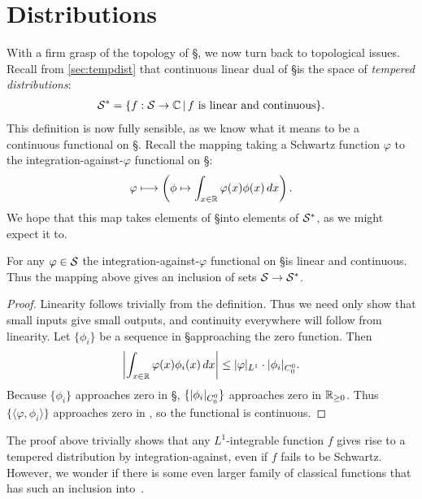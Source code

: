 
  \setcounter{chapter}{2}
  \setcounter{thm}{0}
  \chapter{Distributions}
  \label{ch:dists}
  
  With a firm grasp of the topology of \S, we now turn back to topological issues.
  Recall from \cref{sec:tempdist} that continuous linear dual of \S is the space of \emph{tempered distributions}:
  \begin{align*}
    \S^* = \{f:\S\rightarrow\C\,\vert\,f\text{ is linear and continuous}\} \text{.}
  \end{align*}
  This definition is now fully sensible, as we know what it means to be a continuous functional on \S.
  Recall the mapping taking a Schwartz function $\varphi$ to the integration-against-$\varphi$ functional on \S:
  \begin{align*}
    \varphi \longmapsto \left( \phi \mapsto \int_{x\in\R} \varphi(x) \phi(x)\,dx \right) \text{.}
  \end{align*}
  We hope that this map takes elements of \S into elements of $\S^*$, as we might expect it to.
  \begin{thm}
    \label{thm:intagainstiscont}
    For any $\varphi\in\S$ the integration-against-$\varphi$ functional on \S is linear and continuous.
    Thus the mapping above gives an inclusion of sets $\S\rightarrow\S^*$.
  \end{thm}
  \begin{proof}
    Linearity follows trivially from the definition.
    Thus we need only show that small inputs give small outputs, and continuity everywhere will follow from linearity.
    Let $\{\phi_i\}$ be a sequence in \S approaching the zero function.
    Then
    \begin{align*}
      \left|\int_{x\in\R} \varphi(x)\phi_i(x)\,dx\right|
      \le |\varphi|_{L^1}\cdot |\phi_i|_\Coo \text{.}
    \end{align*}
    Because $\{\phi_i\}$ approaches zero in \S, $\{|\phi_i|_\Coo\}$ approaches zero in $\R_{\ge0}$.
    Thus $\{\langle \varphi,\phi_i\rangle\}$ approaches zero in \C, so the functional is continuous.
  \end{proof}
  The proof above trivially shows that any $L^1$-integrable function $f$ gives rise to a tempered distribution by integration-against, even if $f$ fails to be Schwartz.
  However, we wonder if there is some even larger family of classical functions that has such an inclusion into~\SS.
